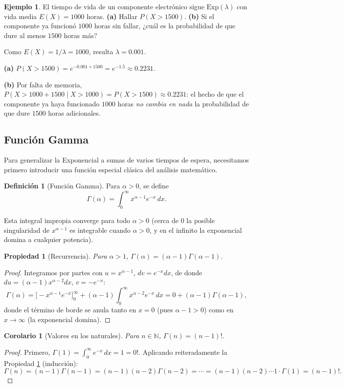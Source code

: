 \documentclass[11pt,a4paper]{article}
\theoremstyle{plain}
\newtheorem{propiedad}[teorema]{Propiedad}
\newtheorem{corolario}[teorema]{Corolario}
\theoremstyle{definition}
\newtheorem{definicion}[teorema]{Definición}
\newtheorem{ejemplo}[teorema]{Ejemplo}
\theoremstyle{remark}
\begin{document}
\begin{ejemplo}
El tiempo de vida de un componente electrónico sigue $\text{Exp}(\lambda)$ con vida media $E(X)=1000$ horas. \textbf{(a)} Hallar $P(X>1500)$. \textbf{(b)} Si el componente ya funcionó $1000$ horas sin fallar, ¿cuál es la probabilidad de que dure al menos $1500$ horas más?

Como $E(X)=1/\lambda=1000$, resulta $\lambda=0.001$.

\textbf{(a)} $P(X>1500)=e^{-0.001\times1500}=e^{-1.5}\approx0.2231$.

\textbf{(b)} Por falta de memoria, $P(X>1000+1500\mid X>1000)=P(X>1500)\approx0.2231$: el hecho de que el componente ya haya funcionado $1000$ horas \emph{no cambia en nada} la probabilidad de que dure $1500$ horas adicionales.
\end{ejemplo}

\subsection{Función Gamma}\label{sec:gamma}

Para generalizar la Exponencial a sumas de varios tiempos de espera, necesitamos primero introducir una función especial clásica del análisis matemático.

\begin{definicion}[Función Gamma]
Para $\alpha>0$, se define
$$\Gamma(\alpha)=\int_0^\infty x^{\alpha-1}e^{-x}\,dx.$$
\end{definicion}

Esta integral impropia converge para todo $\alpha>0$ (cerca de $0$ la posible singularidad de $x^{\alpha-1}$ es integrable cuando $\alpha>0$, y en el infinito la exponencial domina a cualquier potencia).

\begin{propiedad}[Recurrencia]\label{prop:gamma_recurrencia}
Para $\alpha>1$, $\Gamma(\alpha)=(\alpha-1)\Gamma(\alpha-1)$.
\end{propiedad}
\begin{proof}
Integramos por partes con $u=x^{\alpha-1}$, $dv=e^{-x}dx$, de donde $du=(\alpha-1)x^{\alpha-2}dx$, $v=-e^{-x}$:
$$\Gamma(\alpha)=\big[-x^{\alpha-1}e^{-x}\big]_0^\infty+(\alpha-1)\int_0^\infty x^{\alpha-2}e^{-x}\,dx=0+(\alpha-1)\Gamma(\alpha-1),$$
donde el término de borde se anula tanto en $x=0$ (pues $\alpha-1>0$) como en $x\to\infty$ (la exponencial domina).
\end{proof}

\begin{corolario}[Valores en los naturales]
Para $n\in\mathbb{N}$, $\Gamma(n)=(n-1)!$.
\end{corolario}
\begin{proof}
Primero, $\Gamma(1)=\int_0^\infty e^{-x}\,dx=1=0!$. Aplicando reiteradamente la Propiedad \ref{prop:gamma_recurrencia} (inducción):
$$\Gamma(n)=(n-1)\Gamma(n-1)=(n-1)(n-2)\Gamma(n-2)=\cdots=(n-1)(n-2)\cdots1\cdot\Gamma(1)=(n-1)!.$$
\end{proof}
\end{document}
